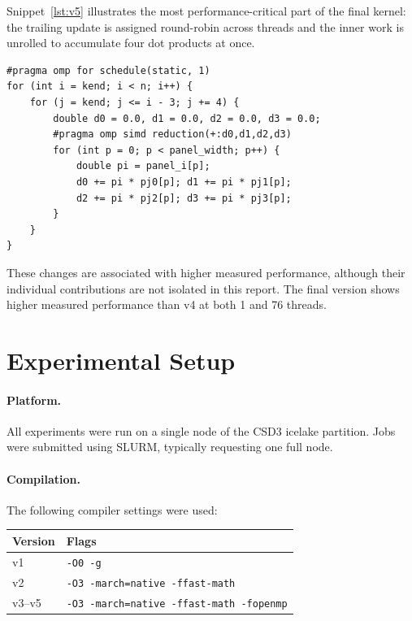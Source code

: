 \documentclass{article}
\newcommand{\snippetspace}{\Needspace{16\baselineskip}}
\begin{document}
\snippetspace
Snippet~\ref{lst:v5} illustrates the most performance-critical part of the
final kernel: the trailing update is assigned round-robin across threads and
the inner work is unrolled to accumulate four dot products at once.

\begin{lstlisting}[style=code,caption={Round-robin scheduling and four-way unrolling in v5.},label={lst:v5}]
#pragma omp for schedule(static, 1)
for (int i = kend; i < n; i++) {
    for (j = kend; j <= i - 3; j += 4) {
        double d0 = 0.0, d1 = 0.0, d2 = 0.0, d3 = 0.0;
        #pragma omp simd reduction(+:d0,d1,d2,d3)
        for (int p = 0; p < panel_width; p++) {
            double pi = panel_i[p];
            d0 += pi * pj0[p]; d1 += pi * pj1[p];
            d2 += pi * pj2[p]; d3 += pi * pj3[p];
        }
    }
}
\end{lstlisting}

These changes are associated with higher measured performance, although
their individual contributions are not isolated in this report. The final
version shows higher measured performance than v4 at both 1 and 76 threads.

\section{Experimental Setup}

\paragraph{Platform.}
All experiments were run on a single node of the CSD3 icelake partition. Jobs were submitted using SLURM, typically requesting one full node.

\paragraph{Compilation.}
The following compiler settings were used:

\begin{center}
\begin{tabular}{ll}
\toprule
Version & Flags \\
\midrule
v1 & \texttt{-O0 -g} \\
v2 & \texttt{-O3 -march=native -ffast-math} \\
v3--v5 & \texttt{-O3 -march=native -ffast-math -fopenmp} \\
\bottomrule
\end{tabular}
\end{center}
\end{document}
